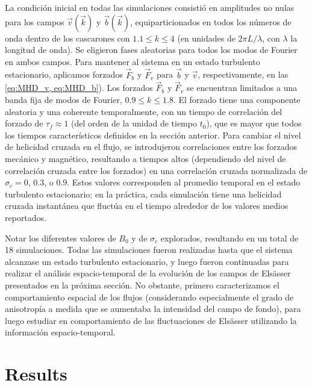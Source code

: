 La condición inicial en todas las simulaciones consistió en amplitudes
no nulas para los campos $\vec{v}(\vec{k})$ y $\vec{b}(\vec{k})$,
equiparticionados en todos los números de onda dentro de los
cascarones con $1.1 \leq k \leq 4$ (en unidades de $2\pi L/\lambda$,
con $\lambda$ la longitud de onda). Se eligieron fases aleatorias para
todos los modos de Fourier en ambos campos.  Para mantener al sistema
en un estado turbulento estacionario, aplicamos forzados $\vec{F}_b$ y
$\vec{F}_v$ para $\vec{b}$ y $\vec{v}$, respectivamente, en las
\cref{eq:MHD_v, eq:MHD_b}). Los forzados $\vec{F}_b$ y $\vec{F}_v$ se
encuentran limitados a una banda fija de modos de Fourier,
$0.9\leq k \leq 1.8$. El forzado tiene una componente aleatoria y una
coherente temporalmente, con un tiempo de correlación del forzado de
$\tau_f \approx 1$ (del orden de la unidad de tiempo $t_0$), que es
mayor que todos los tiempos característicos definidos en la sección
anterior.  Para cambiar el nivel de helicidad cruzada en el flujo, se
introdujeron correlaciones entre los forzados mecánico y magnético,
resultando a tiempos altos (dependiendo del nivel de correlación
cruzada entre los forzados) en una correlación cruzada normalizada de
$\sigma_c=0$, $0.3$, o $0.9$. Estos valores corresponden al promedio
temporal en el estado turbulento estacionario; en la práctica, cada
simulación tiene una helicidad cruzada instantánea que fluctúa en el
tiempo alrededor de los valores medios reportados.

Notar los diferentes valores de $B_0$ y de $\sigma_c$ explorados,
resultando en un total de 18 simulaciones. Todas las simulaciones
fueron realizadas hasta que el sistema alcanzase un estado turbulento
estacionario, y luego fueron continuadas para realizar el análisis
espacio-temporal de la evolución de los campos de Els\"asser
presentados en la próxima sección. No obstante, primero caracterizamos
el comportamiento espacial de los flujos (considerando especialmente
el grado de anisotropía a medida que se aumentaba la intensidad del
campo de fondo), para luego estudiar en comportamiento de las
fluctuaciones de Els\"asser utilizando la información
espacio-temporal.

\section{Results}\label{sec_results}

